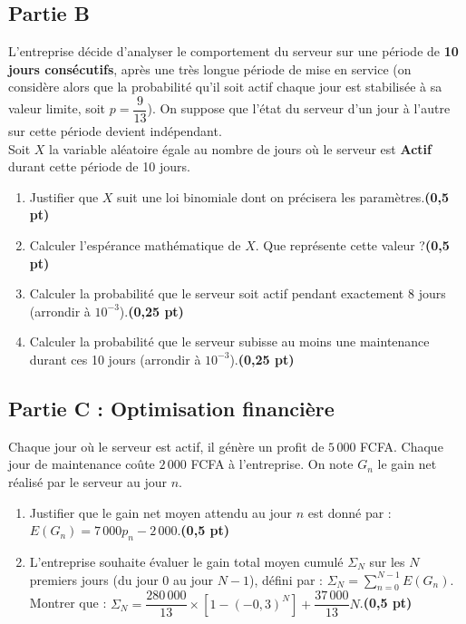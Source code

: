 \documentclass[12pt,a4paper]{article}
\begin{document}
\subsection*{Partie B }
L'entreprise décide d'analyser le comportement du serveur sur une période de \textbf{10 jours consécutifs}, après une très longue période de mise en service (on considère alors que la probabilité qu'il soit actif chaque jour est stabilisée à sa valeur limite, soit $p = \dfrac{9}{13}$). On suppose que l'état du serveur d'un jour à l'autre sur cette période devient indépendant.\\
Soit $X$ la variable aléatoire égale au nombre de jours où le serveur est \textbf{Actif} durant cette période de 10 jours.
\begin{enumerate}
    \item Justifier que $X$ suit une loi binomiale dont on précisera les paramètres.\hfill \textbf{(0,5 pt)}
    \item Calculer l'espérance mathématique de $X$. Que représente cette valeur ?\hfill \textbf{(0,5 pt)}
    \item Calculer la probabilité que le serveur soit actif pendant exactement 8 jours (arrondir à $10^{-3}$).\hfill \textbf{(0,25 pt)}
    \item Calculer la probabilité que le serveur subisse au moins une maintenance durant ces 10 jours (arrondir à $10^{-3}$).\hfill \textbf{(0,25 pt)}
\end{enumerate}

\subsection*{Partie C : Optimisation financière}
Chaque jour où le serveur est actif, il génère un profit de $5\,000$ FCFA. Chaque jour de maintenance coûte $2\,000$ FCFA à l'entreprise. On note $G_n$ le gain net réalisé par le serveur au jour $n$.
\begin{enumerate}
    \item Justifier que le gain net moyen attendu au jour $n$ est donné par : $E(G_n) = 7\,000p_n - 2\,000$.\hfill \textbf{(0,5 pt)}
    \item L'entreprise souhaite évaluer le gain total moyen cumulé $\Sigma_N$ sur les $N$ premiers jours (du jour 0 au jour $N-1$), défini par : $\Sigma_N = \sum_{n=0}^{N-1} E(G_n)$.\\
    Montrer que : $\Sigma_N = \dfrac{280\,000}{13} \times \left[1 - (-0,3)^N\right] + \dfrac{37\,000}{13}N$.\hfill \textbf{(0,5 pt)}
\end{enumerate}
\end{document}
